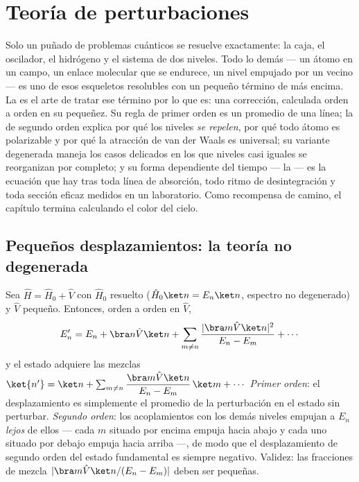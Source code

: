\chapter{Teoría de perturbaciones}\label{ch:b3:perturbation-theory}

Solo un puñado de problemas cuánticos se resuelve exactamente: la caja, el
oscilador, el hidrógeno y el sistema de dos niveles. Todo lo demás --- un
átomo en un campo, un enlace molecular que se endurece, un nivel empujado
por un vecino --- es uno de esos esqueletos resolubles con un pequeño
término de más encima. La  es el arte de tratar ese
término por lo que es: una corrección, calculada orden a orden en su
pequeñez. Su regla de primer orden es un promedio de una línea; la de
segundo orden explica por qué los niveles \emph{se repelen}, por qué todo
átomo es polarizable y por qué la atracción de van der Waals es universal;
su variante degenerada maneja los casos delicados en los que niveles casi
iguales se reorganizan por completo; y su forma dependiente del tiempo --- la
 --- es la ecuación que hay tras toda línea de
absorción, todo ritmo de desintegración y toda sección eficaz medidos en un
laboratorio. Como recompensa de camino, el capítulo termina calculando el
color del cielo.

\section{Pequeños desplazamientos: la teoría no degenerada}

\begin{theorem}\label{thm:b3:perturbation-theory:corrections}
Sea $\hat H = \hat H_0 + \hat V$ con $\hat H_0$ resuelto
($\hat H_0\ket n = E_n\ket n$, espectro no degenerado) y $\hat V$
pequeño. Entonces, orden a orden en $\hat V$,
\[
E_n' = E_n + \bra n\hat V\ket n
 + \sum_{m \neq n}\frac{|\bra m\hat V\ket n|^2}{E_n - E_m}
 + \cdots
\]
y el estado adquiere las mezclas $\ket{n'} = \ket n + \sum_{m\neq
n}\dfrac{\bra m\hat V\ket n}{E_n - E_m}\,\ket m + \cdots$
\emph{Primer orden}: el desplazamiento es simplemente el promedio de la
perturbación en el estado sin perturbar. \emph{Segundo orden}: los
acoplamientos con los demás niveles empujan a $E_n$ \emph{lejos} de ellos
--- cada $m$ situado por encima empuja hacia abajo y cada uno situado por
debajo empuja hacia arriba ---, de modo que el desplazamiento de segundo
orden del estado fundamental es siempre negativo. Validez: las fracciones de
mezcla $|\bra m\hat V\ket n/(E_n - E_m)|$ deben ser pequeñas.
\end{theorem}

